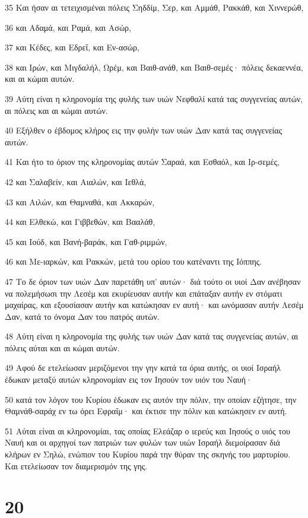 \par 35 Και ήσαν αι τετειχισμέναι πόλεις Σηδδίμ, Σερ, και Αμμάθ, Ρακκάθ, και Χιννερώθ,
\par 36 και Αδαμά, και Ραμά, και Ασώρ,
\par 37 και Κέδες, και Εδρεΐ, και Εν-ασώρ,
\par 38 και Ιρών, και Μιγδαλήλ, Ωρέμ, και Βαιθ-ανάθ, και Βαιθ-σεμές· πόλεις δεκαεννέα, και αι κώμαι αυτών.
\par 39 Αύτη είναι η κληρονομία της φυλής των υιών Νεφθαλί κατά τας συγγενείας αυτών, αι πόλεις και αι κώμαι αυτών.
\par 40 Εξήλθεν ο έβδομος κλήρος εις την φυλήν των υιών Δαν κατά τας συγγενείας αυτών.
\par 41 Και ήτο το όριον της κληρονομίας αυτών Σαραά, και Εσθαόλ, και Ιρ-σεμές,
\par 42 και Σαλαβείν, και Αιαλών, και Ιεθλά,
\par 43 και Αιλών, και Θαμναθά, και Ακκαρών,
\par 44 και Ελθεκώ, και Γιββεθών, και Βααλάθ,
\par 45 και Ιούδ, και Βανή-βαράκ, και Γαθ-ριμμών,
\par 46 και Με-ιαρκών, και Ρακκών, μετά του ορίου του κατέναντι της Ιόππης.
\par 47 Το δε όριον των υιών Δαν παρετάθη υπ' αυτών· διά τούτο οι υιοί Δαν ανέβησαν να πολεμήσωσι την Λεσέμ και εκυρίευσαν αυτήν και επάταξαν αυτήν εν στόματι μαχαίρας, και εξουσίασαν αυτήν και κατώκησαν εν αυτή· και ωνόμασαν αυτήν Λεσέμ Δαν, κατά το όνομα Δαν του πατρός αυτών.
\par 48 Αύτη είναι η κληρονομία της φυλής των υιών Δαν κατά τας συγγενείας αυτών, αι πόλεις αύται και αι κώμαι αυτών.
\par 49 Αφού δε ετελείωσαν μεριζόμενοι την γην κατά τα όρια αυτής, οι υιοί Ισραήλ έδωκαν μεταξύ αυτών κληρονομίαν εις τον Ιησούν τον υιόν του Ναυή·
\par 50 κατά τον λόγον του Κυρίου έδωκαν εις αυτόν την πόλιν, την οποίαν εζήτησε, την Θαμνάθ-σαράχ εν τω όρει Εφραΐμ· και έκτισε την πόλιν και κατώκησεν εν αυτή.
\par 51 Αύται είναι αι κληρονομίαι, τας οποίας Ελεάζαρ ο ιερεύς και Ιησούς ο υιός του Ναυή και οι αρχηγοί των πατριών των φυλών των υιών Ισραήλ διεμοίρασαν διά κλήρων εν Σηλώ, ενώπιον του Κυρίου παρά την θύραν της σκηνής του μαρτυρίου. Και ετελείωσαν τον διαμερισμόν της γης.

\chapter{20}

